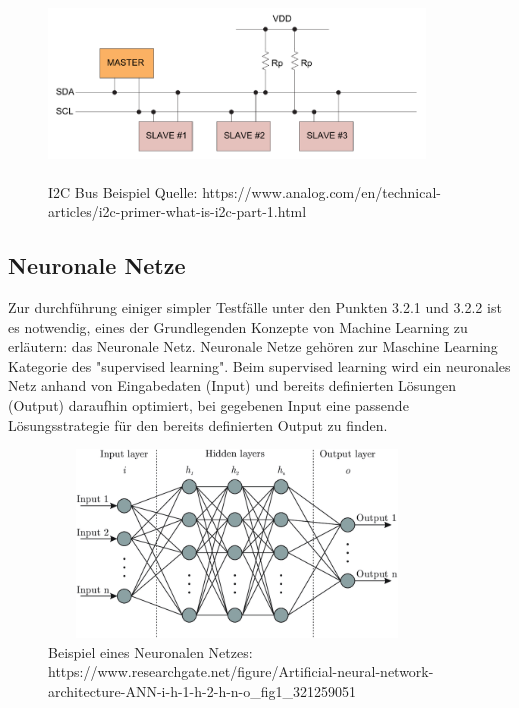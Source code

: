 \begin{figure}[H]
    \centering
    \includegraphics[height= 5cm, width = 10cm]{Pictures/I2C_Bus.png}
    \caption{I2C Bus Beispiel Quelle: https://www.analog.com/en/technical-articles/i2c-primer-what-is-i2c-part-1.html}
\end{figure}

\subsection{Neuronale Netze}

Zur durchführung einiger simpler Testfälle unter den Punkten 3.2.1 und 3.2.2 ist es notwendig, eines der Grundlegenden Konzepte von Machine Learning zu erläutern: das Neuronale Netz.
Neuronale Netze gehören zur Maschine Learning Kategorie des "supervised learning". Beim supervised learning wird ein neuronales Netz anhand von Eingabedaten (Input) und bereits definierten Lösungen (Output) daraufhin optimiert, bei gegebenen Input eine passende Lösungsstrategie für den bereits definierten Output zu finden. 


\begin{figure}[H]
    \centering
    \includegraphics[height= 5cm, width = 10cm]{Pictures/NN_Concept.png}
    \caption{Beispiel eines Neuronalen Netzes: https://www.researchgate.net/figure/Artificial-neural-network-architecture-ANN-i-h-1-h-2-h-n-o_fig1_321259051}
\end{figure}


